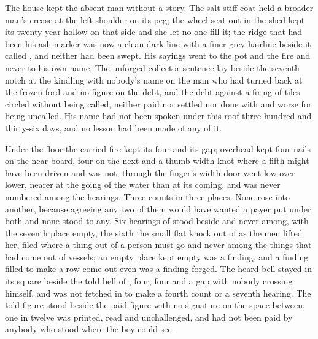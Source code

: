 The house kept the absent man without a story. The salt-stiff coat held a broader man's crease at the left shoulder on its peg; the wheel-seat out in the shed kept its twenty-year hollow on that side and she let no one fill it; the ridge that had been his ash-marker was now a clean dark line with a finer grey hairline beside it called , and neither had been swept. His sayings went to the pot and the fire and never to his own name. The unforged collector sentence lay beside the seventh notch at the kindling with nobody's name on the man who had turned back at the frozen ford and no figure on the debt, and the debt against a firing of tiles circled without being called, neither paid nor settled nor done with and worse for being uncalled. His name had not been spoken under this roof three hundred and thirty-six days, and no lesson had been made of any of it.

Under the floor the carried fire kept its four and its gap; overhead  kept four nails on the near board, four on the next and a thumb-width knot where a fifth might have been driven and was not; through the finger's-width door  went low over lower, nearer at the going of the water than at its coming, and was never numbered among the hearings. Three counts in three places. None rose into another, because agreeing any two of them would have wanted a payer put under both and none stood to any. Six hearings of  stood beside and never among, with the seventh place empty, the sixth the small flat knock out of  as the men lifted her, filed where a thing out of a person must go and never among the things that had come out of vessels; an empty place kept empty was a finding, and a finding filled to make a row come out even was a finding forged. The heard bell stayed in its square beside the told bell of , four, four and a gap with nobody crossing himself, and was not fetched in to make a fourth count or a seventh hearing. The told figure stood beside the paid figure with no signature on the space between; one in twelve was printed, read and unchallenged, and had not been paid by anybody who stood where the boy could see.

\scenebreak

